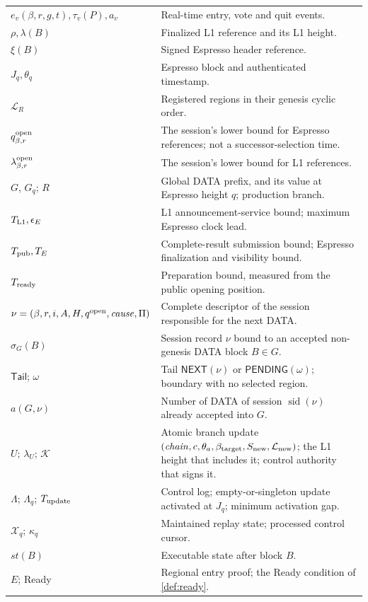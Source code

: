 \documentclass[11pt,a4paper]{article}
\newcommand{\tagg}[1]{\ensuremath{\mathsf{#1}}}
\begin{document}
\begin{table}[htbp]
\begin{tabularx}{\linewidth}{@{}p{.32\linewidth}Y@{}}
$e_v(\beta,r,g,t),\tau_v(P),a_v$ & Real-time entry, vote and quit events.\\
$\rho,\lambda(B)$ & Finalized L1 reference and its L1 height.\\
$\xi(B)$ & Signed Espresso header reference.\\
$J_q,\theta_q$ & Espresso block and authenticated timestamp.\\
$\mathcal L_R$ & Registered regions in their genesis cyclic order.\\
$q_{\beta,r}^{\rm open}$ & The session's lower bound for Espresso references; not a successor-selection time.\\
$\lambda_{\beta,r}^{\rm open}$ & The session's lower bound for L1 references.\\
$G$, $G_q$; $R$ & Global DATA prefix, and its value at Espresso height $q$; production branch.\\
$T_{\rm L1},\epsilon_E$ & L1 announcement-service bound; maximum Espresso clock lead.\\
$T_{\rm pub},T_E$ & Complete-result submission bound; Espresso finalization and visibility bound.\\
$T_{\rm ready}$ & Preparation bound, measured from the public opening position.\\
$\nu=(\beta,r,i,A,H,q^{\rm open},\mathit{cause},\Pi)$ & Complete descriptor of the session responsible for the next DATA.\\
$\sigma_G(B)$ & Session record $\nu$ bound to an accepted non-genesis DATA block $B\in G$.\\
$\mathsf{Tail}$; $\omega$ & Tail $\tagg{NEXT}(\nu)$ or $\tagg{PENDING}(\omega)$; boundary with no selected region.\\
$a(G,\nu)$ & Number of DATA of session $\operatorname{sid}(\nu)$ already accepted into $G$.\\
$U$; $\lambda_U$; $\mathcal K$ & Atomic branch update $(\mathit{chain},c,\theta_a,\beta_{\rm target},S_{\rm new},\mathcal L_{\rm new})$; the L1 height that includes it; control authority that signs it.\\
$\Lambda$; $\Lambda_q$; $T_{\rm update}$ & Control log; empty-or-singleton update activated at $J_q$; minimum activation gap.\\
$\mathcal X_q$; $\kappa_q$ & Maintained replay state; processed control cursor.\\
$\mathit{st}(B)$ & Executable state after block $B$.\\
$E$; Ready & Regional entry proof; the Ready condition of \cref{def:ready}.\\
\bottomrule\end{tabularx}
\end{table}
\end{document}
